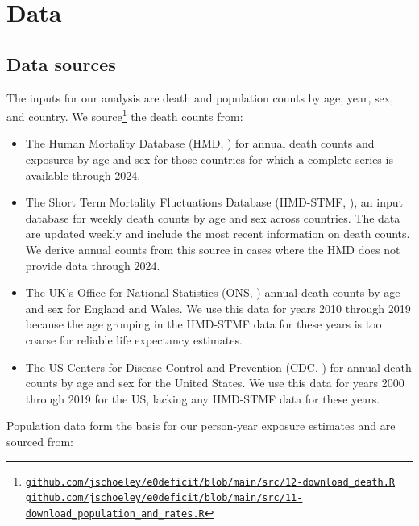 \documentclass[12pt]{article}
\begin{document}
\clearpage

\section{Data}

\subsection{Data sources}

The inputs for our analysis are death and population counts by age, year, sex, and country. We source\footnote{
\href{https://github.com/jschoeley/e0deficit/blob/main/src/12-download_death.R}{\texttt{github.com/jschoeley/e0deficit/blob/main/src/12-download\_death.R}}\\
\href{https://github.com/jschoeley/e0deficit/blob/main/src/11-download_population_and_rates.R}{\texttt{github.com/jschoeley/e0deficit/blob/main/src/11-download\_population\_and\_rates.R}}
} the death counts from:

\begin{itemize}
    \item The Human Mortality Database (HMD, \cite{HMD2025, Barbieri2015}) for annual death counts and exposures by age and sex for those countries for which a complete series is available through 2024.
    \item The Short Term Mortality Fluctuations Database (HMD-STMF, \cite{jdanov2021b}), an input database for weekly death counts by age and sex across countries. The data are updated weekly and include the most recent information on death counts. We derive annual counts from this source in cases where the HMD does not provide data through 2024.
    \item The UK's Office for National Statistics (ONS, \cite{officefornationalstatistics2025}) annual death counts by age and sex for England and Wales. We use this data for years 2010 through 2019 because the age grouping in the HMD-STMF data for these years is too coarse for reliable life expectancy estimates.
    \item The US Centers for Disease Control and Prevention (CDC, \cite{centersfordiseasecontrolandprevention2025}) for annual death counts by age and sex for the United States. We use this data for years 2000 through 2019 for the US, lacking any HMD-STMF data for these years.
\end{itemize}

Population data form the basis for our person-year exposure estimates and are sourced from:
\end{document}
